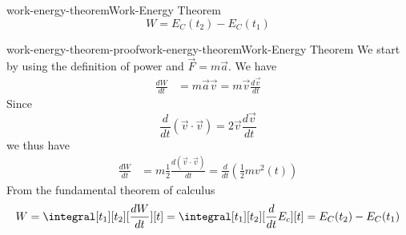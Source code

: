 \documentclass[preview]{standalone}
\begin{document}
\begin{snippettheorem}{work-energy-theorem}{Work-Energy Theorem }
    \[
        W = E_C(t_2) - E_C(t_1)
    \]
\end{snippettheorem}

\begin{snippetproof}{work-energy-theorem-proof}{work-energy-theorem}{Work-Energy Theorem}
    We start by using the definition of power and \(\vec{F}=m\vec{a}\). We have
    \begin{align*}
        \frac{dW}{dt} &= m\vec{a}\vec{v} = m\vec{v}\frac{d\vec{v}}{dt}
    \end{align*}
    Since
    \[
        \frac{d}{dt}\left(\vec{v}\cdot \vec{v}\right) = 2\vec{v}\frac{d\vec{v}}{dt}
    \]
    we thus have
    \begin{align*}
        \frac{dW}{dt} &= m \frac{1}{2} \frac{d(\vec{v} \cdot \vec{v})}{dt}
        = \frac{d}{dt} \left(\frac{1}{2} m v^2(t)\right)
    \end{align*}
    From the fundamental theorem of calculus
    \[
        W = \integral[t_1][t_2][\frac{dW}{dt}][t]
        = \integral[t_1][t_2][\frac{d}{dt}E_c][t]
        = E_C(t_2) - E_C(t_1)
    \]
\end{snippetproof}
\end{document}
